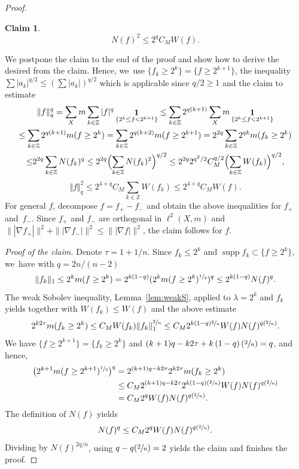 \documentclass[JEP,XML,SOM,Unicode,published]{cedram}
\newcommand{\Psfrac}[2]{(\sfrac{#1}{#2})}
\theoremstyle{plain}
\theoremstyle{definition}
\newtheorem*{claim}{Claim}
\DeclareMathOperator{\supp}{supp}
\DeclareMathOperator{\Eins}{\mathbf{1}}
\begin{document}
\begin{proof}
\begin{claim}
\[
N(f)^{2}
\leq
2^{q}C_M
W(f).
\]
\end{claim}
We postpone the claim to the end of the proof and show how to derive the desired from the claim. Hence, we~use
$ \{f_k\geq 2^k\}=\{f\geq 2^{k+1}\} $, the inequality $\sum \vert a_k\vert^{q/2}\leq \left(\sum \vert a_k\vert\right)^{q/2}$ which is applicable since $q/2\geq 1$ and the claim to estimate
\begin{multline*}
\Vert f\Vert_q^q
=\sum_{X}m\sum_{k\in\mathbb{Z}}\vert f\vert^q\Eins_{\{2^k\leq f< 2^{k+1}\}}
\leq \sum_{k\in\mathbb{Z}}2^{q(k+1)}\sum_{X}m \Eins_{\{2^k\leq f< 2^{k+1}\}}
\\
\leq \sum_{k\in\mathbb{Z}}2^{q(k+1)}m(f\geq 2^k)
=\sum_{k\in\mathbb{Z}}2^{q(k+2)}m(f\geq 2^{k+1})
=2^{2q}\sum_{k\in\mathbb{Z}}2^{qk}m(f_k\geq 2^{k})
\\
{\le}2^{2q}\sum_{k\in\mathbb{Z}}N(f_k)^q
\leq 2^{2q}\Bigl(\sum_{k\in\mathbb{Z}}N(f_k)^2\Bigr)^{q/2}
\leq 2^{2q}2^{q^2/2}C_M^{q/2}\Bigl(\sum_{k\in\mathbb{Z}}
W(f_k)\Bigr)^{q/2},
\end{multline*}
\ie
\[
\Vert f\Vert_q^2
\leq 2^{4+q}C_M\sum_{k\in\mathbb{Z}}W(f_k)\leq 2^{4+q}C_M W(f).
\]
For general $f$, decompose $f=f_+-f_-$ and obtain the above inequalities for $f_+$ and~$f_-$. Since $ f_{+} $ and $ f_{-} $ are orthogonal in $\ell^2(X,m)$ and $ \||\nabla f_{+}|\|^{2} +\||\nabla f_{-}|\|^{2}\leq \||\nabla {f}|\|^{2} $, the claim follows for $f$.

\noindent
\emph{Proof of the claim.} Denote $\tau=1+1/n$.
Since $f_k\leq 2^k$ and $ \supp f_{k} \subset \{f\geq 2^k\} $, we~have {with $ q=2n/(n-2) $}
\[
\Vert f_k\Vert_1\leq 2^km(f\geq 2^k)
=2^{k\left(1-q\right)}(2^{k}m(f\geq 2^k)^{\sfrac{1}{q}})^{q}
\leq
2^{k\left(1-q\right)}N(f)^{q}.
\]
{The weak Sobolev inequality,} Lemma~\ref{lem:weakS}, applied to $\lambda=2^k$ and $f_k$ yields together with {$ W(f_{k})\leq W(f) $ and} the above estimate
\[
2^{k2\tau}m(f_k\geq 2^k)
\leq C_MW(f_k)\Vert f_k\Vert_1^{\sfrac2n}
\leq
C_M2^{k\left(1-q\right)\sfrac2n}W(f)N(f)^{q\Psfrac2n}.
\]
We have
$ \{f\geq 2^{k+1}\}=\{f_k\geq 2^k\} $ and $ (k+1)q-k2\tau+k\left(1-q\right)\Psfrac2n=q$, and hence,
\begin{align*}
\bigl(2^{k+1}m(f\geq 2^{k+1})^{\sfrac{1}{q}}\bigr)^{q}
&=2^{(k+1)q-k2\tau}2^{k2\tau} m(f_k\geq 2^k)
\\
&\leq
C_M2^{(k+1)q-k2\tau}2^{k\left(1-q\right)\Psfrac2n}W(f)N(f)^{q\Psfrac2n}
\\
&=
C_M2^{q
}W(f)N(f)^{q\Psfrac2n}.
\end{align*}
The definition of $N(f)$ yields
\[
N(f)^{q}
\leq
C_M2^{q}
W(f)N(f)^{q\Psfrac2n}.
\]
{Dividing by $N(f)^{2q/n}$}, using $q-q\Psfrac2n=2$ yields the claim {and finishes the proof}.
\end{proof}
\end{document}
